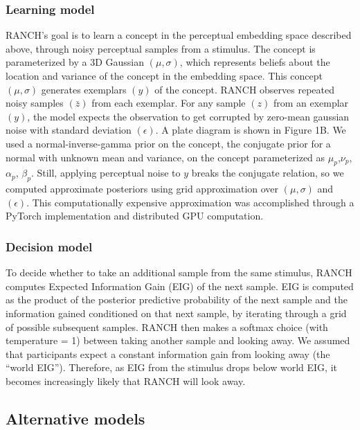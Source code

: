 \documentclass[10pt, letterpaper]{article}
\begin{document}
\hypertarget{learning-model}{%
\subsubsection{Learning model}\label{learning-model}}

RANCH's goal is to learn a concept in the perceptual embedding space
described above, through noisy perceptual samples from a stimulus. The
concept is parameterized by a 3D Gaussian \((\mu,\sigma)\), which
represents beliefs about the location and variance of the concept in the
embedding space. This concept \((\mu,\sigma)\) generates exemplars
\((y)\) of the concept. RANCH observes repeated noisy samples
\((\bar{z})\) from each exemplar. For any sample \((z)\) from an
exemplar \((y)\), the model expects the observation to get corrupted by
zero-mean gaussian noise with standard deviation \((\epsilon)\). A plate
diagram is shown in Figure 1B. We used a normal-inverse-gamma prior on
the concept, the conjugate prior for a normal with unknown mean and
variance, on the concept parameterized as
\(\mu_{p}\),\(\nu_{p}\),\(\alpha_{p}\), \(\beta_{p}\). Still, applying
perceptual noise to \(y\) breaks the conjugate relation, so we computed
approximate posteriors using grid approximation over \((\mu,\sigma)\)
and \((\epsilon)\). This computationally expensive approximation was
accomplished through a PyTorch implementation and distributed GPU
computation.

\hypertarget{decision-model}{%
\subsubsection{Decision model}\label{decision-model}}

To decide whether to take an additional sample from the same stimulus,
RANCH computes Expected Information Gain (EIG) of the next sample. EIG
is computed as the product of the posterior predictive probability of
the next sample and the information gained conditioned on that next
sample, by iterating through a grid of possible subsequent samples.
RANCH then makes a softmax choice (with temperature = 1) between taking
another sample and looking away. We assumed that participants expect a
constant information gain from looking away (the ``world EIG'').
Therefore, as EIG from the stimulus drops below world EIG, it becomes
increasingly likely that RANCH will look away.

\hypertarget{alternative-models}{%
\subsection{Alternative models}\label{alternative-models}}
\end{document}

